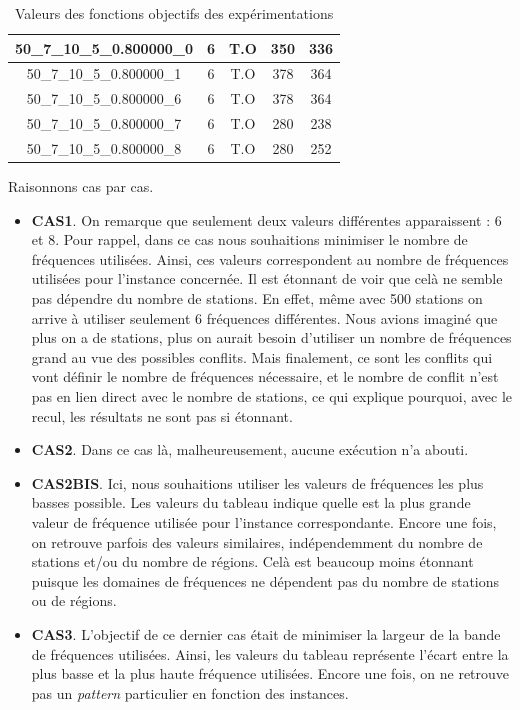 \documentclass[a4paper, 10pt]{article}
\begin{document}
\begin{table}[!h]
\begin{tabular}{ |c|c|c|c|c| }
          \hline \hline
          \scriptsize{50\_7\_10\_5\_0.800000\_0} & 6 & \textcolor[gray]{0.6}{ T.O} &350  & 336 \\
          \hline
          \scriptsize{50\_7\_10\_5\_0.800000\_1} & 6 & \textcolor[gray]{0.6}{ T.O} & 378 & 364 \\
          \hline
          \scriptsize{50\_7\_10\_5\_0.800000\_6} & 6 & \textcolor[gray]{0.6}{ T.O} & 378 & 364 \\
          \hline
          \scriptsize{50\_7\_10\_5\_0.800000\_7} & 6 & \textcolor[gray]{0.6}{ T.O} & 280 &  238\\
          \hline
          \scriptsize{50\_7\_10\_5\_0.800000\_8} & 6 & \textcolor[gray]{0.6}{ T.O }&280 & 252 \\
          \hline
          \end{tabular}
          \caption{Valeurs des fonctions objectifs des expérimentations}
        \end{table}
        \newpage

        Raisonnons cas par cas.
        \begin{itemize}
          \item \textbf{CAS1}. On remarque que seulement deux valeurs différentes apparaissent : $6$ et $8$. Pour rappel, dans ce cas nous souhaitions minimiser le nombre de fréquences utilisées. Ainsi, ces valeurs correspondent au nombre de fréquences utilisées pour l'instance concernée.
          Il est étonnant de voir que celà ne semble pas dépendre du nombre de stations. En effet, même avec 500 stations on arrive à utiliser seulement $6$ fréquences différentes. Nous avions imaginé que plus on a de stations, plus on aurait besoin d'utiliser un nombre de fréquences grand au vue des possibles conflits. Mais finalement, ce sont les conflits qui vont définir le nombre de fréquences nécessaire, et le nombre de conflit n'est pas en lien direct avec le nombre de stations, ce qui explique pourquoi, avec le recul, les résultats ne sont pas si étonnant.
          \item \textbf{CAS2}. Dans ce cas là, malheureusement, aucune exécution n'a abouti.
          \item \textbf{CAS2BIS}. Ici, nous souhaitions utiliser les valeurs de fréquences les plus basses possible. Les valeurs du tableau indique quelle est la plus grande valeur de fréquence utilisée pour l'instance correspondante. Encore une fois, on retrouve parfois des valeurs similaires, indépendemment du nombre de stations et/ou du nombre de régions. Celà est beaucoup moins étonnant puisque les domaines de fréquences ne dépendent pas du nombre de stations ou de régions.
          \item \textbf{CAS3}. L'objectif de ce dernier cas était de minimiser la largeur de la bande de fréquences utilisées. Ainsi, les valeurs du tableau représente l'écart entre la plus basse et la plus haute fréquence utilisées. Encore une fois, on ne retrouve pas un \textit{pattern} particulier en fonction des instances.
        \end{itemize}
\end{document}
